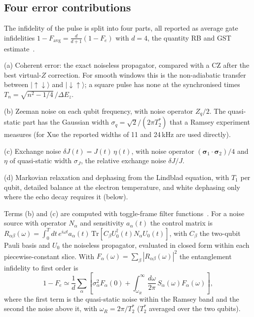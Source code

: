 \documentclass[reprint,aps,pra,floatfix,superscriptaddress,longbibliography,nofootinbib]{revtex4-2}
\newcommand{\dEz}{\Delta E_z}
\newcommand{\Ts}{T_2^{*}}
\begin{document}
\subsection{Four error contributions}

The infidelity of the pulse is split into four parts, all reported as average gate infidelities $1-F_\mathrm{avg} = \tfrac{d}{d+1}(1-F_e)$ with $d=4$, the quantity RB and GST estimate~\cite{magesan2011,nielsen2021}.

(a) Coherent error: the exact noiseless propagator, compared with a CZ after the best virtual-$Z$ correction. For smooth windows this is the non-adiabatic transfer between $|{\uparrow\downarrow}\rangle$ and $|{\downarrow\uparrow}\rangle$; a square pulse has none at the synchronised times $T_n=\sqrt{n^2-1/4}\,/\dEz$.

(b) Zeeman noise on each qubit frequency, with noise operator $Z_q/2$. The quasi-static part has the Gaussian width $\sigma_q = \sqrt{2}/(2\pi\Ts)$ that a Ramsey experiment measures (for Xue the reported widths of 11 and 24\,kHz are used directly).

(c) Exchange noise $\delta J(t) = J(t)\,\eta(t)$, with noise operator $(\boldsymbol{\sigma}_1\cdot\boldsymbol{\sigma}_2)/4$ and $\eta$ of quasi-static width $\sigma_J$, the relative exchange noise $\delta J/J$.

(d) Markovian relaxation and dephasing from the Lindblad equation, with $T_1$ per qubit, detailed balance at the electron temperature, and white dephasing only where the echo decay requires it (below).

Terms (b) and (c) are computed with toggle-frame filter functions~\cite{green2013,hangleiter2021}. For a noise source with operator $N_\alpha$ and sensitivity $a_\alpha(t)$ the control matrix is $R_{\alpha\beta}(\omega) = \int_0^T dt\, e^{i\omega t} a_\alpha(t)\, \mathrm{Tr}[C_\beta U_0^\dagger(t) N_\alpha U_0(t)]$, with $C_\beta$ the two-qubit Pauli basis and $U_0$ the noiseless propagator, evaluated in closed form within each piecewise-constant slice. With $F_\alpha(\omega) = \sum_\beta |R_{\alpha\beta}(\omega)|^2$ the entanglement infidelity to first order is
\begin{equation}
1-F_e \simeq \frac{1}{d}\sum_\alpha\left[\sigma_\alpha^2 F_\alpha(0) + \int_{\omega_R}^{\infty} \frac{d\omega}{2\pi}\, S_\alpha(\omega) F_\alpha(\omega)\right],
\label{eq:ff}
\end{equation}
where the first term is the quasi-static noise within the Ramsey band and the second the noise above it, with $\omega_R = 2\pi/\Ts$ ($\Ts$ averaged over the two qubits).
\end{document}
